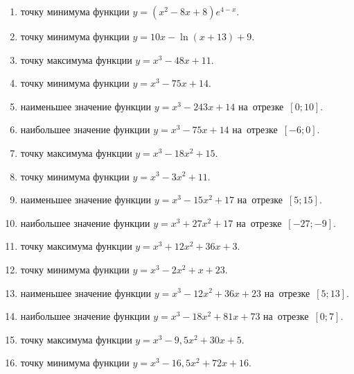 \documentclass[a4paper,10pt]{article}
\begin{document}
\begin{enumerate}
\item {} точку минимума функции $y=\left(x^2-8x+8\right){{e}^{4-x}}$.

\item {} точку минимума функции $y=10x-\ln \left(x+13\right)+9$.

\item {} точку максимума функции $y=x^3 -48x +11$.

\item {} точку минимума функции $y=x^3 -75x+14$.

\item {} наименьшее значение функции $y=x^3 -243x+14$ на~отрезке~$\left[0;10\right]$.

\item {} наибольшее значение функции $y=x^3 -75x+14$ на~отрезке~$\left[-6;0\right]$.

\item {} точку максимума функции $y=x^3 -18x^2+15$.

\item {} точку минимума функции $y=x^3 -3x^2+11$.

\item {} наименьшее значение функции $y=x^3 -15x^2+17$ на~отрезке~$\left[5;15\right]$.

\item {} наибольшее значение функции $y=x^3 +27x^2+17$ на~отрезке~$\left[-27;-9\right]$.

\item {} точку максимума функции $y=x^3 +12x^2+36x+3$.

\item {} точку минимума функции $y=x^3 -2x^2+x+23$.

\item {} наименьшее значение функции $y=x^3 -12x^2+36x+23$ на~отрезке~$\left[5;13\right]$.

\item {} наибольшее значение функции $y=x^3 -18x^2+81x+73$ на~отрезке~$\left[0;7\right]$.

\item {} точку максимума функции $y=x^3 -9,5x^2+30x+5$.

\item {} точку минимума функции $y=x^3 -16,5x^2+72x+16$.


\end{enumerate}
\end{document}

